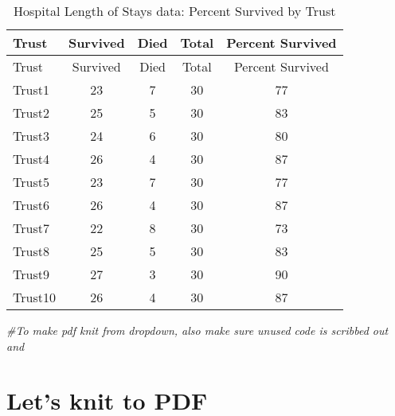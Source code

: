 \documentclass[
]{article}
\newenvironment{Shaded}{\begin{snugshade}}{\end{snugshade}}
\newcommand{\CommentTok}[1]{\textcolor[rgb]{0.56,0.35,0.01}{\textit{#1}}}
\begin{document}
\begin{longtable}[]{@{}lcccc@{}}
\caption{Hospital Length of Stays data: Percent Survived by
Trust}\tabularnewline
\toprule\noalign{}
Trust & Survived & Died & Total & Percent Survived \\
\midrule\noalign{}
\endfirsthead
\toprule\noalign{}
Trust & Survived & Died & Total & Percent Survived \\
\midrule\noalign{}
\endhead
\bottomrule\noalign{}
\endlastfoot
Trust1 & 23 & 7 & 30 & 77 \\
Trust2 & 25 & 5 & 30 & 83 \\
Trust3 & 24 & 6 & 30 & 80 \\
Trust4 & 26 & 4 & 30 & 87 \\
Trust5 & 23 & 7 & 30 & 77 \\
Trust6 & 26 & 4 & 30 & 87 \\
Trust7 & 22 & 8 & 30 & 73 \\
Trust8 & 25 & 5 & 30 & 83 \\
Trust9 & 27 & 3 & 30 & 90 \\
Trust10 & 26 & 4 & 30 & 87 \\
\end{longtable}

\begin{Shaded}
\begin{Highlighting}[]
\CommentTok{\#To make pdf knit from dropdown, also make sure unused code is scribbed out and }
\end{Highlighting}
\end{Shaded}

\section{Let's knit to PDF}\label{lets-knit-to-pdf}
\end{document}
